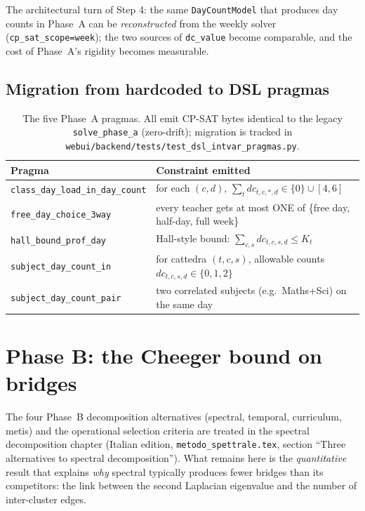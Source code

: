 The architectural turn of Step 4: the same \texttt{DayCountModel}
that produces day counts in Phase~A can be \emph{reconstructed}
from the weekly solver (\texttt{cp\_sat\_scope=week}); the two
sources of \texttt{dc\_value} become comparable, and the cost
of Phase~A's rigidity becomes measurable.

\subsection{Migration from hardcoded to DSL pragmas}

\begin{table}[h]
\centering
\sffamily\small
\begin{tabular}{p{4cm}p{8cm}}
\toprule
Pragma & Constraint emitted \\
\midrule
\texttt{class\_day\_load\_in\_day\_count} &
  for each $(c,d)$, $\sum_t dc_{t,c,*,d} \in \{0\} \cup [4,6]$ \\
\texttt{free\_day\_choice\_3way} &
  every teacher gets at most ONE of \{free day, half-day,
  full week\} \\
\texttt{hall\_bound\_prof\_day} &
  Hall-style bound: $\sum_{c,s} dc_{t,c,s,d} \le K_t$ \\
\texttt{subject\_day\_count\_in} &
  for cattedra $(t,c,s)$, allowable counts
  $dc_{t,c,s,d} \in \{0,1,2\}$ \\
\texttt{subject\_day\_count\_pair} &
  two correlated subjects (e.g.\ Maths+Sci) on the same day \\
\bottomrule
\end{tabular}
\caption{The five Phase~A pragmas. All emit CP-SAT bytes
identical to the legacy \texttt{solve\_phase\_a}
(zero-drift); migration is tracked in
\texttt{webui/backend/tests/test\_dsl\_intvar\_pragmas.py}.}
\label{tab:phase-a-pragmas-en}
\end{table}

\section{Phase B: the Cheeger bound on bridges}
\label{sec:phase-b-decomp-bound-en}

The four Phase~B decomposition alternatives (spectral,
temporal, curriculum, metis) and the operational selection
criteria are treated in the spectral decomposition chapter
(Italian edition, \texttt{metodo\_spettrale.tex}, section
``Three alternatives to spectral decomposition''). What remains
here is the \emph{quantitative} result that explains
\emph{why} spectral typically produces fewer bridges than its
competitors: the link between the second Laplacian eigenvalue
and the number of inter-cluster edges.

